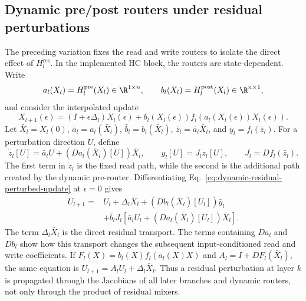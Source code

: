 \documentclass{article}
\newcommand{\Hpre}{H^{\mathrm{pre}}}
\newcommand{\Hpost}{H^{\mathrm{post}}}
\begin{document}
\subsection{Dynamic pre/post routers under residual perturbations}
\label{app:dynamic-residual-routers}
The preceding variation fixes the read and write routers to isolate the direct
effect of $H_l^{\mathrm{res}}$. In the implemented HC block, the routers are
state-dependent. Write
\begin{equation}
 a_l(X_l)=\Hpre_l(X_l)\in\R^{1\times n},\mspace{36mu}
 b_l(X_l)=\Hpost_l(X_l)\in\R^{n\times1},
 \label{eq:dynamic-residual-router-def}
\end{equation}
and consider the interpolated update
\begin{equation}
 X_{l+1}(\epsilon)=(I+\epsilon\Delta_l)X_l(\epsilon)
 +b_l(X_l(\epsilon))f_l\!\left(a_l(X_l(\epsilon))X_l(\epsilon)\right).
 \label{eq:dynamic-residual-perturbed-update}
\end{equation}
Let $\bar X_l=X_l(0)$, $\bar a_l=a_l(\bar X_l)$,
$\bar b_l=b_l(\bar X_l)$, $\bar z_l=\bar a_l\bar X_l$, and
$\bar y_l=f_l(\bar z_l)$. For a perturbation direction $U$, define
\begin{equation}
 \dot z_l[U]=\bar a_lU+(Da_l(\bar X_l)[U])\bar X_l,
 \mspace{36mu}
 \dot y_l[U]=J_l\dot z_l[U],
 \mspace{36mu} J_l=Df_l(\bar z_l).
 \label{eq:dynamic-residual-first-read}
\end{equation}
The first term in $\dot z_l$ is the fixed read path, while the second is the
additional path created by the dynamic pre-router. Differentiating
Eq.~\ref{eq:dynamic-residual-perturbed-update} at $\epsilon=0$ gives
\begin{equation}
 \begin{aligned}
 U_{l+1}={}&U_l+\Delta_l\bar X_l
 +(Db_l(\bar X_l)[U_l])\bar y_l\\
 &+\bar b_lJ_l\!\left[\bar a_lU_l
 +(Da_l(\bar X_l)[U_l])\bar X_l\right].
 \end{aligned}
 \label{eq:dynamic-residual-first-variation}
\end{equation}
The term $\Delta_l\bar X_l$ is the direct residual transport. The terms
containing $Da_l$ and $Db_l$ show how this transport changes the subsequent
input-conditioned read and write coefficients. If
$F_l(X)=b_l(X)f_l(a_l(X)X)$ and $A_l=I+DF_l(\bar X_l)$, the same equation is
$U_{l+1}=A_lU_l+\Delta_l\bar X_l$. Thus a residual perturbation at layer $k$
is propagated through the Jacobians of all later branches and dynamic routers,
not only through the product of residual mixers.
\end{document}
